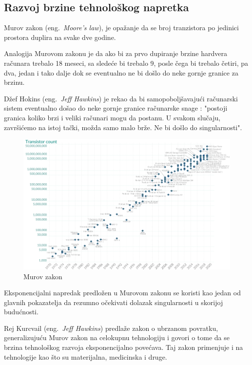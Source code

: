 \documentclass[a4paper]{article}
\begin{document}
\subsection{Razvoj brzine tehnološkog napretka}

Murov zakon (eng.~{\em Moore's law}), je opažanje da se broj tranzistora po jedinici prostora duplira na svake dve godine. 

Analogija Murovom zakonu je da ako bi za prvo dupiranje brzine hardvera računara trebalo 18 meseci, sa sledeće bi trebalo 9, posle čega bi trebalo četiri, pa dva, jedan i tako dalje dok se eventualno ne bi došlo do neke gornje granice za brzinu. \cite{mog-4}

Džef Hokins (eng.~{\em Jeff Hawkins}) je rekao da bi samopoboljšavajući računarski sistem eventualno došao do neke gornje granice računarske snage : "postoji granica koliko brzi i veliki računari mogu da postanu. U svakom slučaju, završićemo na istoj tački, možda samo malo brže. Ne bi došlo do singularnosti". \cite{mog-5}

\begin{figure}[h!]
\begin{center}
\includegraphics[scale=0.35]{moore.png}
\end{center}
\caption{Murov zakon}
\label{fig:frog}
\end{figure}

Eksponencijalni napredak predložen u Murovom zakonu se koristi kao jedan od glavnih pokazatelja da rezumno očekivati dolazak singularnosti u skorijoj budućnosti.

Rej Kurcvail (eng.~{\em Jeff Hawkins}) predlaže zakon o ubrzanom povratku, generalizujuću Murov zakon na celokupnu tehnologiju i govori o tome da se brzina tehnološkog razvoja eksponencijalno povećava. Taj zakon primenjuje i na tehnologije kao što su materijalna, medicinska i druge. \cite{mog-6}
\end{document}
